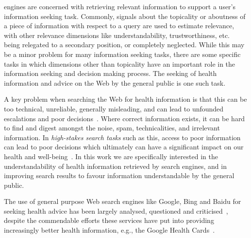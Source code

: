 
 engines are concerned with retrieving relevant information to support a user's information seeking task. Commonly, signals about the topicality or aboutness of a piece of information with respect to a query are used to estimate relevance, with other relevance dimensions like understandability, trustworthiness, etc.~\cite{zhang2014multidimensional} being relegated to a secondary position, or completely neglected. While this may be a minor problem for many information seeking tasks, there are some specific tasks in which dimensions other than topicality have an important role in the information seeking and decision making process. The seeking of health information and advice on the Web by the general public is one such task. 

A key problem when searching the Web for health information is that this can be too technical, unreliable, generally misleading, and can lead to unfounded escalations and poor decisions~\cite{white09b}. Where correct information exists, it can be hard to find and digest amongst the noise, spam, technicalities, and irrelevant information. In \textit{high-stakes search tasks} such as this, access to poor information can lead to poor decisions which ultimately can have a significant impact on our health and well-being~\cite{white09b,white13}. In this work we are specifically interested in the understandability of health information retrieved by search engines, and in improving search results to favour information understandable by the general public. 

The use of general purpose Web search engines like Google, Bing and Baidu for seeking health advice has been largely analysed, questioned and criticised~\cite{graber99,fitzsimmons10,wiener13,patel13,atcherson14,meillier17,ellimoottil12}, despite the commendable efforts these services have put into providing increasingly better health information, e.g., the Google Health Cards~\cite{gabrilovich2016cura}. 

